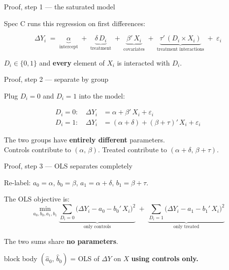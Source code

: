 \documentclass[aspectratio=169,11pt]{beamer}
\newcommand{\emphbox}[1]{%
  \begin{beamercolorbox}[rounded=true,sep=7pt,wd=\linewidth]{block body}%
    \small\color{slate} #1%
  \end{beamercolorbox}}
\begin{document}
\begin{frame}{Proof, step 1 --- the saturated model}
\vspace{0.4em}
\begin{center}\color{warmgray}\small
Spec C runs this regression on first differences:\end{center}
\vspace{0.3em}
\[
\Delta Y_i \;=\; \underbrace{\alpha}_{\text{intercept}}
            \;+\; \underbrace{\delta\, D_i}_{\text{treatment}}
            \;+\; \underbrace{\beta'\, X_i}_{\text{covariates}}
            \;+\; \underbrace{\tau'\,(D_i \times X_i)}_{\text{treatment interactions}}
            \;+\; \varepsilon_i
\]
\vspace{0.4em}
\begin{center}
$D_i \in \{0, 1\}$ \quad and \quad \textbf{every} element of $X_i$ is interacted with $D_i$.
\end{center}
\end{frame}

\begin{frame}{Proof, step 2 --- separate by group}
\vspace{0.3em}
\begin{center}\color{warmgray}\small Plug $D_i = 0$ and $D_i = 1$ into the model:\end{center}
\vspace{0.4em}
\begin{align*}
D_i = 0: \quad \Delta Y_i &= \alpha + \beta'\, X_i + \varepsilon_i \\[6pt]
D_i = 1: \quad \Delta Y_i &= (\alpha + \delta) + (\beta + \tau)'\, X_i + \varepsilon_i
\end{align*}
\vspace{0.4em}
\begin{center}
The two groups have \textbf{entirely different} parameters.\\[0.4em]
\color{warmgray}\small
Controls contribute to $(\alpha,\,\beta)$.\quad
Treated contribute to $(\alpha+\delta,\,\beta+\tau)$.
\end{center}
\end{frame}

\begin{frame}{Proof, step 3 --- OLS separates completely}
\vspace{0.4em}
\begin{center}\color{warmgray}\small
Re-label: \;$a_0 = \alpha$, \;$b_0 = \beta$, \;$a_1 = \alpha+\delta$, \;$b_1 = \beta+\tau$.
\end{center}
\vspace{0.3em}
The OLS objective is:
\[
\min_{a_0,b_0,a_1,b_1}
  \underbrace{\sum_{D_i=0}\!\bigl(\Delta Y_i - a_0 - b_0'\,X_i\bigr)^{\!2}}_{\text{only controls}}
  \;+\;
  \underbrace{\sum_{D_i=1}\!\bigl(\Delta Y_i - a_1 - b_1'\,X_i\bigr)^{\!2}}_{\text{only treated}}
\]
\vspace{0.3em}
\begin{center}
The two sums share \textbf{no parameters}.\\[0.4em]
\emphbox{$(\hat a_0,\,\hat b_0)$ \;=\; OLS of $\Delta Y$ on $X$ \textbf{using controls only.}}
\end{center}
\end{frame}
\end{document}
